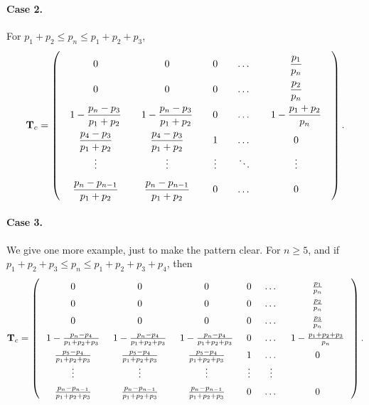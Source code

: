 \documentclass[12pt]{article}
\begin{document}
\paragraph{Case 2.}

For $p_1 + p_2 \le p_n \le p_1 + p_2 + p_3$,
$$
  \mathbf T_{c}
=
\left(
  \arraycolsep=10.0pt\def\arraystretch{2.0}
  \begin{array}{cccccc}
    0     &   0   &   0   &   \dots  &   \dfrac{p_1}{p_n}       \\
    0     &   0   &   0   &   \dots  &   \dfrac{p_2}{p_n} \\
    1 - \dfrac{p_n - p_3}{p_1 + p_2}  &   1 - \dfrac{p_n - p_3}{p_1 + p_2}  &   0   &   \dots  &   1 - \dfrac{p_1+p_2}{p_n} \\
    \dfrac{p_4 - p_3}{p_1 + p_2}     &  \dfrac{p_4 - p_3}{p_1 + p_2}   &   1   &   \dots  &   0 \\
    \vdots&\vdots &\vdots &   \ddots &   \vdots \\
    \dfrac{p_n - p_{n-1}}{p_1 + p_2} &  \dfrac{p_n - p_{n-1}}{p_1 + p_2} &   0   &   \dots  &   0 \\
  \end{array}
\right).
$$

\paragraph{Case 3.}

We give one more example, just to make the pattern clear.
%
For $n \ge 5$, and
if $p_1 + p_2 + p_3 \le p_n \le p_1 + p_2 + p_3 + p_4$,
then
$$
  \mathbf T_{c}
=
\left(
  \arraycolsep=7.0pt\def\arraystretch{1.5}
  \begin{array}{cccccccc}
    0     &   0   &   0   &   0 & \dots  &   \frac{p_1}{p_n}       \\
    0     &   0   &   0   &   0 & \dots  &   \frac{p_2}{p_n} \\
    0     &   0   &   0   &   0 & \dots  &   \frac{p_3}{p_n} \\
    1 - \frac{p_n - p_4}{p_1 + p_2 + p_3}  &
    1 - \frac{p_n - p_4}{p_1 + p_2 + p_3}  &
    1 - \frac{p_n - p_4}{p_1 + p_2 + p_3}  & 0   &   \dots  &   1 - \frac{p_1+p_2 + p_3}{p_n} \\
    \frac{p_5 - p_4}{p_1 + p_2 + p_3}   &
    \frac{p_5 - p_4}{p_1 + p_2 + p_3}   &
    \frac{p_5 - p_4}{p_1 + p_2 + p_3}   &
    1   &   \dots  &   0 \\
    \vdots&\vdots &\vdots & \vdots  &   \vdots \\
    \frac{p_n - p_{n-1}}{p_1 + p_2 + p_3} &
    \frac{p_n - p_{n-1}}{p_1 + p_2 + p_3} &
    \frac{p_n - p_{n-1}}{p_1 + p_2 + p_3} &
    0   &   \dots  &   0 \\
  \end{array}
\right).
$$
\end{document}
